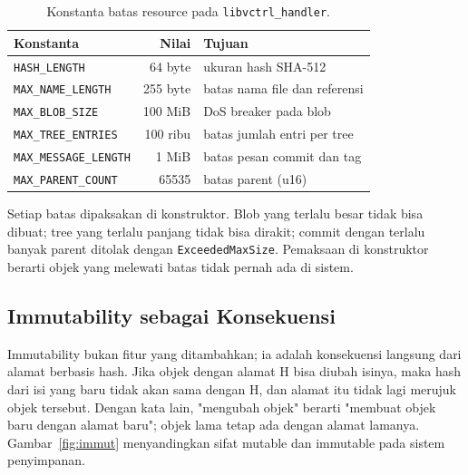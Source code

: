 \documentclass[11pt,a4paper]{article}
\begin{document}
\begin{table}[H]
	\centering
	\caption{Konstanta batas resource pada \texttt{libvctrl\_handler}.}
	\label{tab:limits}
	\footnotesize
	\begin{tabularx}{\textwidth}{l r X}
		\toprule
		Konstanta                     & Nilai    & Tujuan                        \\
		\midrule
		\texttt{HASH\_LENGTH}         & 64 byte  & ukuran hash SHA-512           \\
		\texttt{MAX\_NAME\_LENGTH}    & 255 byte & batas nama file dan referensi \\
		\texttt{MAX\_BLOB\_SIZE}      & 100 MiB  & DoS breaker pada blob         \\
		\texttt{MAX\_TREE\_ENTRIES}   & 100 ribu & batas jumlah entri per tree   \\
		\texttt{MAX\_MESSAGE\_LENGTH} & 1 MiB    & batas pesan commit dan tag    \\
		\texttt{MAX\_PARENT\_COUNT}   & 65535    & batas parent (u16)            \\
		\bottomrule
	\end{tabularx}
\end{table}

Setiap batas dipaksakan di konstruktor. Blob yang terlalu besar tidak bisa dibuat; tree yang terlalu panjang tidak bisa dirakit; commit dengan terlalu banyak parent ditolak dengan \texttt{ExceededMaxSize}. Pemaksaan di konstruktor berarti objek yang melewati batas tidak pernah ada di sistem.

\subsection{Immutability sebagai Konsekuensi}

Immutability bukan fitur yang ditambahkan; ia adalah konsekuensi langsung dari alamat berbasis hash. Jika objek dengan alamat H bisa diubah isinya, maka hash dari isi yang baru tidak akan sama dengan H, dan alamat itu tidak lagi merujuk objek tersebut. Dengan kata lain, "mengubah objek" berarti "membuat objek baru dengan alamat baru"; objek lama tetap ada dengan alamat lamanya. Gambar~\ref{fig:immut} menyandingkan sifat mutable dan immutable pada sistem penyimpanan.
\end{document}
